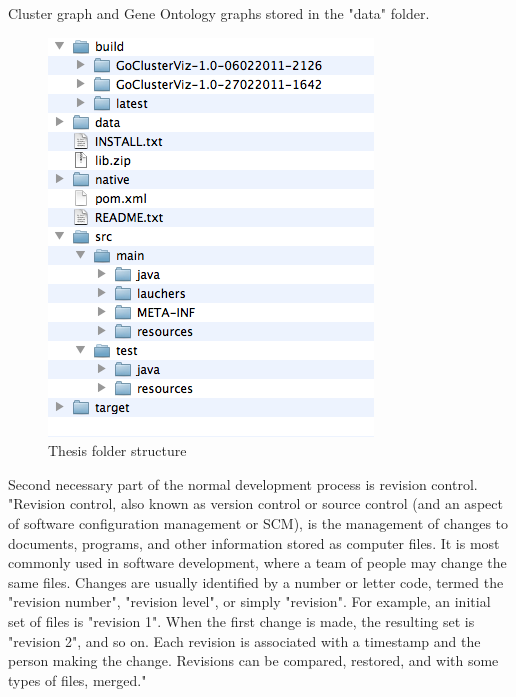 \documentclass[a4paper,oneside]{article}
\begin{document}
Cluster graph and Gene Ontology graphs stored in the "data" folder.

\begin{figure}
\begin{center}
	\includegraphics[scale=0.6]{thesis_folder_structure.png}
	\caption{Thesis folder structure}
	\label{THESIS_FOLDER_STRUCTURE}
\end{center}
\end{figure}

Second necessary part of the normal development process is revision control. "Revision control, also known as version control or source control (and an aspect of software configuration management or SCM), is the management of changes to documents, programs, and other information stored as computer files. It is most commonly used in software development, where a team of people may change the same files. Changes are usually identified by a number or letter code, termed the "revision number", "revision level", or simply "revision". For example, an initial set of files is "revision 1". When the first change is made, the resulting set is "revision 2", and so on. Each revision is associated with a timestamp and the person making the change. Revisions can be compared, restored, and with some types of files, merged."~\cite{REVISION_CONTROL} 
\end{document}
